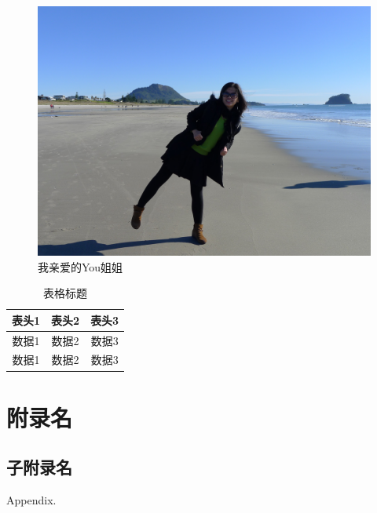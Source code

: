 \documentclass[11pt,a4paper,oneside,fleqn]{article}
\begin{document}
\begin{figure}[htbp]
  \centering
  \includegraphics[scale=.13]{Figs/20160703_153846000_iOS.jpg}
  \caption{我亲爱的You姐姐}
  \label{FIG:1-2}
\end{figure}

\begin{table}[htbp]
\begin{center}
\caption{表格标题}
\begin{tabular}{ccc}%
\toprule  %
	表头1 & 表头2 & 表头3\\
\midrule  %
	数据1 & 数据2 & 数据3\\
  \hline
  数据1 & 数据2 & 数据3\\
\bottomrule %
\end{tabular}
\label{Table1}
\end{center}
\end{table}

\begin{center}
\end{center}

\newpage
 

\newpage
\appendix

\section{附录名}
\subsection{子附录名}

Appendix.
\end{document}
